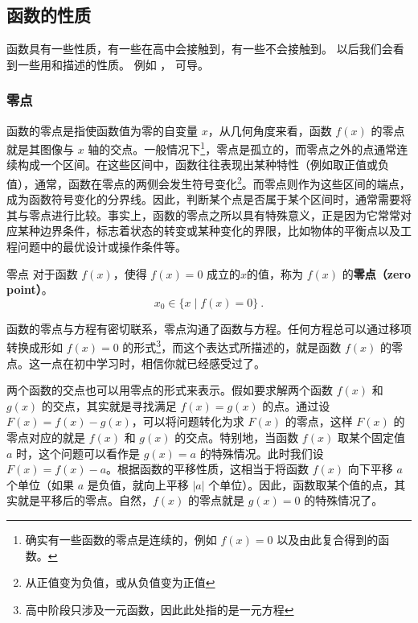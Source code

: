 \subsection{函数的性质}\label{sub_HsFunC_1}

函数具有一些性质，有一些在高中会接触到，有一些不会接触到。
以后我们会看到一些用和描述的性质。 例如 %
， 可导。
\subsubsection{零点}

函数的零点是指使函数值为零的自变量 $x$，从几何角度来看，函数 $f(x)$ 的零点就是其图像与 $x$ 轴的交点。一般情况下\footnote{确实有一些函数的零点是连续的，例如 $f(x) = 0$ 以及由此复合得到的函数。}，零点是孤立的，而零点之外的点通常连续构成一个区间。在这些区间中，函数往往表现出某种特性（例如取正值或负值），通常，函数在零点的两侧会发生符号变化\footnote{从正值变为负值，或从负值变为正值}。而零点则作为这些区间的端点，成为函数符号变化的分界线。因此，判断某个点是否属于某个区间时，通常需要将其与零点进行比较。事实上，函数的零点之所以具有特殊意义，正是因为它常常对应某种边界条件，标志着状态的转变或某种变化的界限，比如物体的平衡点以及工程问题中的最优设计或操作条件等。

\begin{definition}{零点}
对于函数 $f(x)$，使得 $f(x) = 0$ 成立的$x$的值，称为 $f(x)$ 的\textbf{零点（zero point）}。
\begin{equation}
x_0 \in \{ x \mid f(x) = 0 \}~.
\end{equation}
\end{definition}

函数的零点与方程有密切联系，零点沟通了函数与方程。任何方程总可以通过移项转换成形如 $f(x) = 0$ 的形式\footnote{高中阶段只涉及一元函数，因此此处指的是一元方程}，而这个表达式所描述的，就是函数 $f(x)$ 的零点。这一点在初中学习时，相信你就已经感受过了。

两个函数的交点也可以用零点的形式来表示。假如要求解两个函数 $f(x)$ 和 $g(x)$ 的交点，其实就是寻找满足 $f(x) = g(x)$ 的点。通过设 $F(x) = f(x) - g(x)$，可以将问题转化为求 $F(x)$ 的零点，这样 $F(x)$ 的零点对应的就是 $f(x)$ 和 $g(x)$ 的交点。特别地，当函数 $f(x)$ 取某个固定值 $a$ 时，这个问题可以看作是 $g(x) = a$ 的特殊情况。此时我们设 $F(x) = f(x) - a$。根据函数的平移性质，这相当于将函数 $f(x)$ 向下平移 $a$ 个单位（如果 $a$ 是负值，就向上平移 $|a|$ 个单位）。因此，函数取某个值的点，其实就是平移后的零点。自然，$f(x)$ 的零点就是 $g(x) = 0$ 的特殊情况了。

